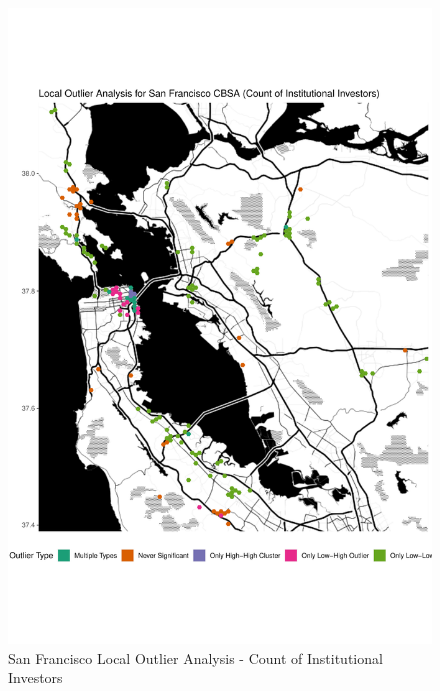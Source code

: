 \begin{figure}
	\centering
	\includegraphics[width=1\linewidth]{Figures/ChapterIV/SF_Count_LO}
	\caption[San Francisco CBSA Local Outlier Analysis - Count of Institutional Investors 1999-2018]{San Francisco Local Outlier Analysis - Count of Institutional Investors}
	\label{fig:SFcountlocaloutliercount}
\end{figure}

